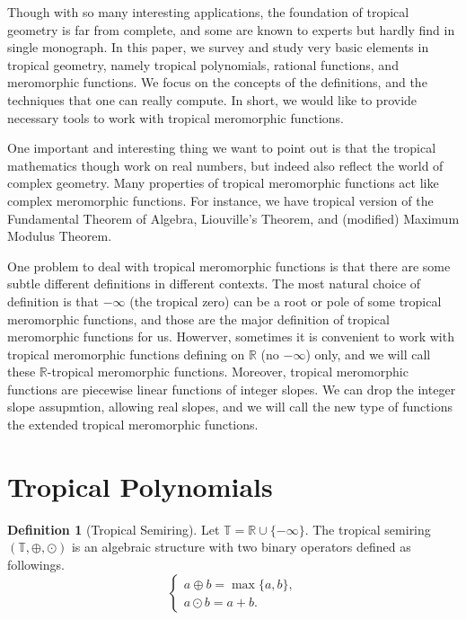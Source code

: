 \documentclass{amsart}
\theoremstyle{definition}
\newtheorem{defn}{Definition}[section]
\theoremstyle{remark}
\begin{document}
Though with so many interesting applications, the foundation of tropical geometry is far from complete, and some  are known to experts but hardly find in single monograph. In this paper, we survey and study very basic elements in tropical geometry, namely tropical polynomials, rational functions, and meromorphic functions. We focus on the concepts of the definitions, and the techniques that one can really compute. In short, we would like to provide necessary tools to work with tropical meromorphic functions.

One important and interesting thing we want to point out is that the tropical mathematics though work on real numbers, but indeed also reflect the world of complex geometry. Many properties of tropical meromorphic functions act like complex meromorphic functions. For instance, we have tropical version of the Fundamental Theorem of Algebra, Liouville's Theorem, and (modified) Maximum Modulus Theorem.

One problem to deal with tropical meromorphic functions is that there are some subtle different definitions in different contexts. The most natural choice of definition is that $-\infty$ (the tropical zero) can be a root or pole of some tropical meromorphic functions, and those are the major definition of tropical meromorphic functions for us. Howerver, sometimes it is convenient to work with tropical meromorphic functions defining on ${\mathbb{R}}$ (no $-\infty$) only, and we will call these ${\mathbb{R}}$-tropical meromorphic functions. Moreover, tropical meromorphic functions are piecewise linear functions of integer slopes. We can drop the integer slope assupmtion, allowing real slopes, and we will call the new type of functions the extended tropical meromorphic functions.

\section{Tropical Polynomials}

\begin{defn} [Tropical Semiring]\label{semiring}
Let ${\mathbb{T}} = {\mathbb{R}} \cup \{ -\infty \}$. The tropical semiring $({\mathbb{T}}, {\oplus}, {\odot})$ is an algebraic structure with two binary operators defined as followings.
\[
\begin{cases}
a {\oplus} b = \max \{a,b\},\\
a {\odot} b = a + b.
\end{cases}
\]
\end{defn}
\end{document}
